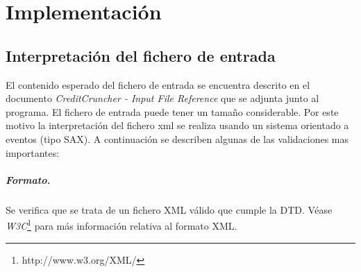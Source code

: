 
%
%
%
%
%
%
%
%

\chapter{Implementaci\'on}
\label{sec:implementation}


\section{Interpretaci\'on del fichero de entrada}

El contenido esperado del fichero de entrada se encuentra
descrito en el documento \emph{CreditCruncher - Input File Reference}
que se adjunta junto al programa.
\newline
\newline
El fichero de entrada puede tener un tama\~no considerable. Por
este motivo la interpretaci\'on del fichero xml se realiza usando un
sistema orientado a eventos (tipo SAX). A continuaci\'on se
describen algunas de las validaciones mas importantes:

\paragraph{Formato.} Se verifica que se trata de un fichero XML
v\'alido que cumple la DTD. V\'ease \emph{W3C}\footnote{http://www.w3.org/XML/}
para m\'as informaci\'on relativa al formato XML.

